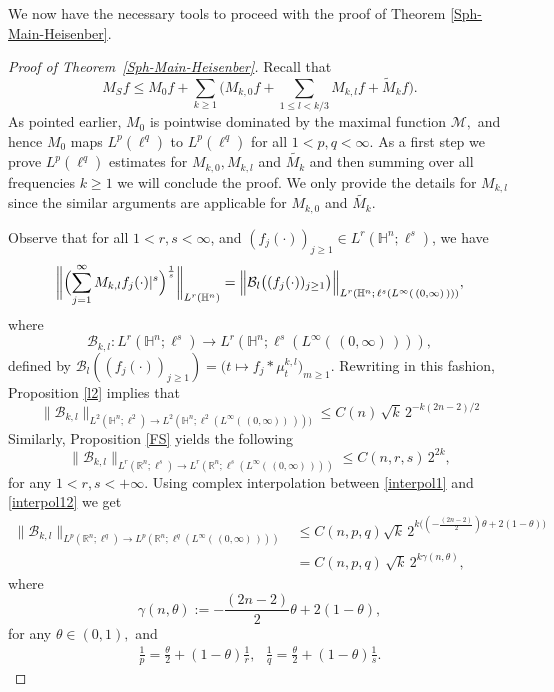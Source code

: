 \documentclass[11pt]{amsart}
\newcommand{\Ha}{\mathbb{H}^n}
\theoremstyle{definition}
\numberwithin{equation}{section}
\begin{document}
We now have the necessary tools to proceed with the proof of Theorem \ref{Sph-Main-Heisenber}.

\begin{proof}[Proof of Theorem~\ref{Sph-Main-Heisenber}]
Recall that
$$M_{S}f \leq M_0f+\sum_{k\ge 1}\big(M_{k,0}f+\sum_{1\le l<k/3} M_{k,l}f
+ \widetilde M_kf\big).$$
As pointed earlier, $M_0$ is pointwise dominated by the maximal function $\mathcal{M},$ and hence $M_{0}$ maps $L^p(\ell^q)$ to $L^p(\ell^q)$ for all $1<p, q<\infty.$ As a first step we prove $L^p(\ell^q)$ estimates for $M_{k, 0}, M_{k, l}$ and $\widetilde{M_{k}}$ and then summing over all frequencies $k\geq 1$ we will conclude the proof. We only provide the details for $M_{k, l}$ since the similar arguments are applicable for  $M_{k, 0}$ and $\widetilde{M_{k}}.$

Observe that for all $1<r,s<\infty$,  and $(f_j(\cdot))_{j\geq1} \in L^r(\Ha;\ell^s)$, we have
\begin{align}
\label{need1}
\biggl\|\Bigl(\sum_{j=1}^{\infty}{M_{k, l}} f_j(\cdot)|^s\Bigr)^\frac{1}{s}\biggr\|_{L^r(\Ha)}= \Bigl\| \mathcal{B}_{l}\bigl((f_j(\cdot))_{j\geq1}\bigr) \Bigr\|_{L^r(\Ha;\, \ell^s(L^\infty(\,(0, \infty)\,)))},
\end{align}
where 
$$\mathcal{B}_{k, l} :  L^r(\Ha;\ell^s) \to L^r(\Ha;\ell^s(L^\infty(\,(0, \infty)\,))),$$
defined by $\mathcal{B}_{l}((f_j(\cdot))_{j\geq1}) =\bigl(t \mapsto f_j*\mu^{k, l}_{t} \bigr)_{m\geq 1}.$
 Rewriting in this fashion, Proposition \ref{l2} implies that
 \begin{equation}\label{interpol1}\|\mathcal{B}_{k, l}\|_{L^2(\Ha;\ell^2) \to L^2(\Ha;\ell^2(L^\infty(\,(0, \infty))\,)))} \leq C(n
 )\, \sqrt{k}\, 2^{-k(2n-2)/2}\end{equation}
Similarly, Proposition \ref{FS} yields the following
\begin{equation}\label{interpol12} \|\mathcal{B}_{k, l}\|_{L^{r}(\mathbb{R}^n;\ell^{s}) \to L^{r}(\mathbb R^n;\ell^{s}(L^\infty(\,(0, \infty)\,)))} \leq C({n, r, s})\, 2^{2k},\end{equation}
for any $1 < r, s < + \infty$. Using complex interpolation between \eqref{interpol1} and \eqref{interpol12} we get 
\begin{align}\label{interpol3}
\nonumber \|\mathcal{B}_{k, l}\|_{L^p(\mathbb{R}^n;\ell^q) \to L^p(\mathbb R^n;\ell^q(L^\infty(\,(0, \infty)\,))) } &\leq C(n, p, q) \sqrt{k}\,2^{k\big((-\frac{(2n-2)}{2})\theta +2(1-\theta)\big)}\\
&= C(n, p, q)\, \sqrt{k}\,2^{k\gamma(n,\theta)},
\end{align}
where $$\gamma(n, \theta):=-\frac{(2n-2)}{2}\theta +2(1-\theta),$$ for any $\theta\in (0, 1),$ and
\begin{align}\frac1p = \frac\theta 2 + (1 - \theta) \frac1{r},\,\,\,\,\frac1q = \frac\theta 2  + (1 - \theta) \frac1{s}\label{relation}.\end{align}


\end{proof}
\end{document}
